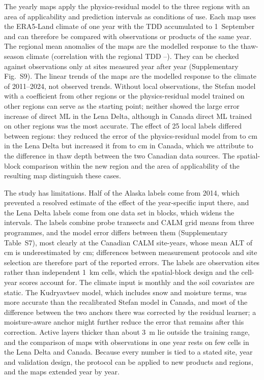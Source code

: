 The yearly maps apply the physics-residual model to the three regions with an area of applicability and prediction intervals as conditions of use. Each map uses the ERA5-Land climate of one year with the TDD accumulated to 1~September and can therefore be compared with observations or products of the same year. The regional mean anomalies of the maps are the modelled response to the thaw-season climate (correlation with the regional TDD \ntddanomAk{}--\ntddanomCa{}). They can be checked against observations only at sites measured year after year (Supplementary Fig.~S9). The linear trends of the maps are the modelled response to the climate of 2011--2024, not observed trends. Without local observations, the Stefan model with a coefficient from other regions or the physics-residual model trained on other regions can serve as the starting point; neither showed the large error increase of direct ML in the Lena Delta, although in Canada direct ML trained on other regions was the most accurate. The effect of 25 local labels differed between regions: they reduced the error of the physics-residual model from \ntlrmseLeRszero{} to \ntlrmseLeRstwfive{} cm in the Lena Delta but increased it from \ntlrmseCaRszero{} to \ntlrmseCaRstwfive{} cm in Canada, which we attribute to the difference in thaw depth between the two Canadian data sources. The spatial-block comparison within the new region and the area of applicability of the resulting map distinguish these cases.

The study has limitations. Half of the Alaska labels come from 2014, which prevented a resolved estimate of the effect of the year-specific input there, and the Lena Delta labels come from one data set in \nnblkLe{} blocks, which widens the intervals. The labels combine probe transects and CALM grid means from three programmes, and the model error differs between them (Supplementary Table~S7), most clearly at the \nsrcCaCALMN{} Canadian CALM site-years, whose mean ALT of \nsrcCaCALMObs{} cm is underestimated by \nsrcCaCALMBias{} cm; differences between measurement protocols and site selection are therefore part of the reported errors. The labels are observation sites rather than independent 1~km cells, which the spatial-block design and the cell-year scores account for. The climate input is monthly and the soil covariates are static. The Kudryavtsev model, which includes snow and moisture terms, was more accurate than the recalibrated Stefan model in Canada, and most of the difference between the two anchors there was corrected by the residual learner; a moisture-aware anchor might further reduce the error that remains after this correction. Active layers thicker than about 3~m lie outside the training range, and the comparison of maps with observations in one year rests on few cells in the Lena Delta and Canada. Because every number is tied to a stated site, year and validation design, the protocol can be applied to new products and regions, and the maps extended year by year.

